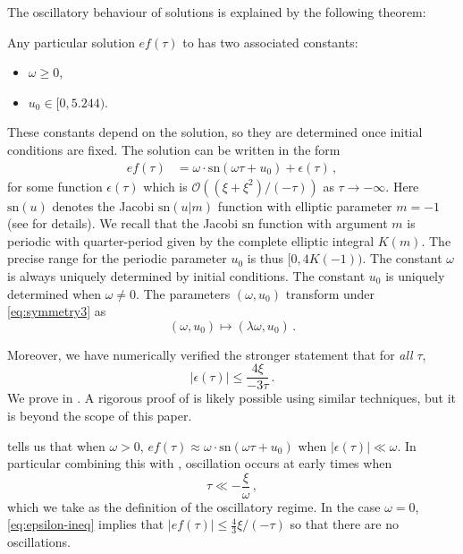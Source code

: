The oscillatory behaviour of solutions is explained by the following theorem: 
\begin{thm}
\label{thm:oscillatory}Any particular solution $ef(\tau)$ to  has two associated constants: 
\begin{itemize}
\item $\omega\geq0$, 
\item $u_{0}\in[0,5.244)$. 
\end{itemize}
These constants depend on the solution, so they are determined once initial conditions are fixed. The solution can be written in the form 
\begin{align}
ef(\tau) & =\omega\cdot\mathrm{sn}(\omega\tau+u_{0})+\epsilon(\tau)\,,\label{eq:approx-quartic}
\end{align}
for some function $\epsilon(\tau)$ which is $\mathcal{O}((\xi+\xi^{2})/(-\tau))$ as $\tau\to-\infty$. Here $\mathrm{sn}(u)$ denotes the Jacobi $\mathrm{sn}(u|m)$ function with elliptic parameter $m=-1$ (see  for details). We recall that the Jacobi $\mathrm{sn}$ function with argument $m$ is periodic with quarter-period given by the complete elliptic integral $K(m)$. The precise range for the periodic parameter $u_{0}$ is thus $[0,4K(-1))$. The constant $\omega$ is always uniquely determined by initial conditions. The constant $u_{0}$ is uniquely determined when $\omega\neq0$. The parameters $(\omega,u_{0})$ transform under \eqref{eq:symmetry3} as 
\begin{equation}
(\omega,u_{0})\mapsto(\lambda\omega,u_{0})\,.\label{eq:ic-transform}
\end{equation}
\end{thm}

Moreover, we have numerically verified the stronger statement that for \emph{all} $\tau$, 
\begin{equation}
\left|\epsilon(\tau)\right|\leq\frac{4\xi}{-3\tau}\,.\label{eq:epsilon-ineq}
\end{equation}
We prove  in . A rigorous proof of  is likely possible using similar techniques, but it is beyond the scope of this paper. 

 tells us that when $\omega>0$, $ef(\tau)\approx\omega\cdot\mathrm{sn}(\omega\tau+u_{0})$ when $\left|\epsilon(\tau)\right|\ll\omega$. In particular combining this with , oscillation occurs at early times when 
\begin{equation}
\tau\ll-\frac{\xi}{\omega}\,,\label{eq:osc-from-omega}
\end{equation}
which we take as the definition of the oscillatory regime. In the case $\omega=0$, \eqref{eq:epsilon-ineq} implies that $|ef(\tau)|\leq\tfrac{4}{3}\xi/(-\tau)$ so that there are no oscillations.

